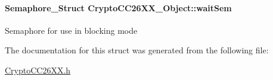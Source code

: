 \paragraph[{wait\-Sem}]{\setlength{\rightskip}{0pt plus 5cm}Semaphore\-\_\-\-Struct Crypto\-C\-C26\-X\-X\-\_\-\-Object\-::wait\-Sem}\label{struct_crypto_c_c26_x_x___object_a5845db71c0440f667b9ab19e22ee8fd5}
Semaphore for use in blocking mode 

The documentation for this struct was generated from the following file\-:\begin{DoxyCompactItemize}
\item 
\hyperlink{_crypto_c_c26_x_x_8h}{Crypto\-C\-C26\-X\-X.\-h}\end{DoxyCompactItemize}
